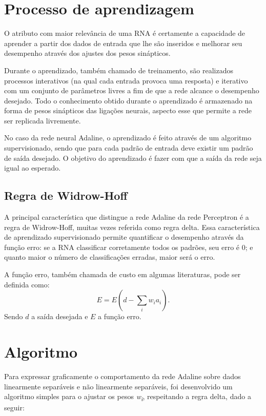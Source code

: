 \documentclass[a4paper,11pt]{article}
\begin{document}
	\section{Processo de aprendizagem}
	
		O atributo com maior relevância de uma RNA é certamente a capacidade de aprender a partir dos dados de entrada que lhe são inseridos e melhorar seu desempenho através dos ajustes dos pesos sinápticos.
		
		Durante o aprendizado, também chamado de treinamento, são realizados processos interativos (na qual cada entrada provoca uma resposta) e iterativo com um conjunto de parâmetros livres a fim de que a rede alcance o desempenho desejado. Todo o conhecimento obtido durante o aprendizado é armazenado na forma de pesos sinápticos das ligações neurais, aspecto esse que permite a rede ser replicada livremente. 
		
		No caso da rede neural Adaline, o aprendizado é feito através de um algoritmo supervisionado, sendo que para cada padrão de entrada deve existir um padrão de saída desejado. O objetivo do aprendizado é fazer com que a saída da rede seja igual ao esperado.
		
		\subsection{Regra de Widrow-Hoff}
		
			A principal característica que distingue a rede Adaline da rede Perceptron é a regra de Widrow-Hoff, muitas vezes referida como regra delta. Essa característica de aprendizado supervisionado permite quantificar o desempenho através da função erro: se a RNA classificar corretamente todos os padrões, seu erro é 0; e quanto maior o número de classificações erradas, maior será o erro. \cite{PsicoConexAntonio}
			
			A função erro, também chamada de custo em algumas literaturas, pode ser definida como:
			\begin{equation*}
				E = E(d - \sum_{i} w_i a_i) . %
			\end{equation*}			
			Sendo $d$ a saída desejada e $E$ a função erro.
			
	\section{Algoritmo}
	
		Para expressar graficamente o comportamento da rede Adaline sobre dados linearmente separáveis e não linearmente separáveis, foi desenvolvido um algoritmo simples para o ajustar os pesos \textit{w\textsubscript{i}}, respeitando a regra delta, dado a seguir:
		
\end{document}
